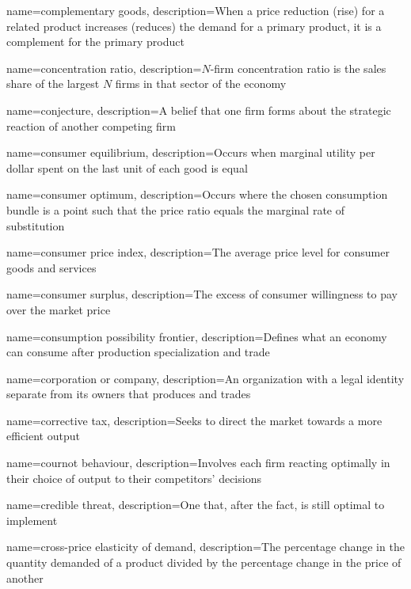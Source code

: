{
	name={complementary goods},
	description={When a price reduction (rise) for a related product increases (reduces) the demand for a primary product, it is a complement for the primary product}
}

{
	name={concentration ratio},
	description={$N$-firm concentration ratio is the sales share of the largest $N$ firms in that sector of the economy}
}

{
	name=conjecture,
	description={A belief that one firm forms about the strategic reaction of another competing firm}
}

{
	name={consumer equilibrium},
	description={Occurs when marginal utility per dollar spent on the last unit of each good is equal}
}

{
	name={consumer optimum},
	description={Occurs where the chosen consumption bundle is a point such that the price ratio equals the marginal rate of substitution}
}

{
	name={consumer price index},
	description={The average price level for consumer goods and services}
}

{
	name={consumer surplus},
	description={The excess of consumer willingness to pay over the market price}
}

{
	name={consumption possibility frontier},
	description={Defines what an economy can consume after production specialization and trade}
}

{
	name={corporation or company},
	description={An organization with a legal identity separate from its owners that produces and trades}
}

{
	name={corrective tax},
	description={Seeks to direct the market towards a more efficient output}
}

{
	name={cournot behaviour},
	description={Involves each firm reacting optimally in their choice of output to their competitors' decisions}
}

{
	name={credible threat},
	description={One that, after the fact, is still optimal to implement}
}

{
	name={cross-price elasticity of demand},
	description={The percentage change in the quantity demanded of a product divided by the percentage change in the price of another}
}

